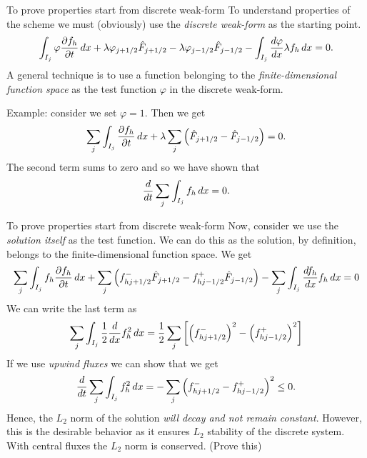 \documentclass[aspectratio=169]{beamer}
\newcommand{\mypause}{}
\newcommand{\pfrac}[2]{\frac{\partial #1}{\partial #2}}
\begin{document}
\begin{frame}{To prove properties start from discrete weak-form}
  \footnotesize
  To understand properties of the scheme we must (obviously) use the
  \emph{discrete weak-form} as the starting point.
  \begin{align*}
    \int_{I_j} \varphi \pfrac{f_h}{t}\thinspace dx
    +
    \lambda \varphi_{j+1/2}\hat{F}_{j+1/2} - \lambda \varphi_{j-1/2}\hat{F}_{j-1/2}
    -
    \int_{I_j}  \frac{d\varphi}{dx}\lambda f_h\thinspace dx = 0.
  \end{align*}
  A general technique is to use a function belonging to the
  \emph{finite-dimensional function space} as the test function
  $\varphi$ in the discrete weak-form.
  \mypause%

  Example: consider we set $\varphi = 1$. Then we get
  \begin{align*}
    \sum_j \int_{I_j} \pfrac{f_h}{t}\thinspace dx
    +
    \lambda \sum_j \left(
    \hat{F}_{j+1/2} - \hat{F}_{j-1/2}
    \right) = 0.
  \end{align*}
  The second term sums to zero and so we have shown that
  \begin{align*}
    \frac{d}{dt}\sum_j \int_{I_j} f_h\thinspace dx = 0.
  \end{align*}  
\end{frame}

\begin{frame}{To prove properties start from discrete weak-form}
  \footnotesize%
  Now, consider we use the \emph{solution itself} as the test
  function. We can do this as the solution, by definition, belongs to
  the finite-dimensional function space. We get
  \begin{align*}
    \sum_j \int_{I_j} f_h \pfrac{f_h}{t}\thinspace dx
    +
    \sum_j \left(f_{hj+1/2}^-\hat{F}_{j+1/2} - f_{hj-1/2}^+\hat{F}_{j-1/2}\right)
    -
    \sum_j \int_{I_j}  \frac{d f_h}{dx} f_h\thinspace dx = 0
  \end{align*}
  We can write the last term as
  \begin{align*}
    \sum_j \int_{I_j}  \frac{1}{2} \frac{d}{dx} f_h^2 \thinspace dx
    = \frac{1}{2} \sum_j \left[ \left(f_{hj+1/2}^-\right)^2  - \left(f_{hj-1/2}^+\right)^2 \right]
  \end{align*}
  If we use \emph{upwind fluxes} we can show that we get
  \begin{align*}
    \frac{d}{dt} \sum_j \int_{I_j}  f_h^2 \thinspace dx
    =
    -\sum_j \left(f_{hj+1/2}^- - f_{hj-1/2}^+\right)^2 \le 0.
  \end{align*}
  Hence, the $L_2$ norm of the solution \emph{will decay and not
    remain constant}. However, this is the desirable behavior as it
  ensures $L_2$ stability of the discrete system. With central fluxes
  the $L_2$ norm is conserved. (Prove this)
\end{frame}
\end{document}
